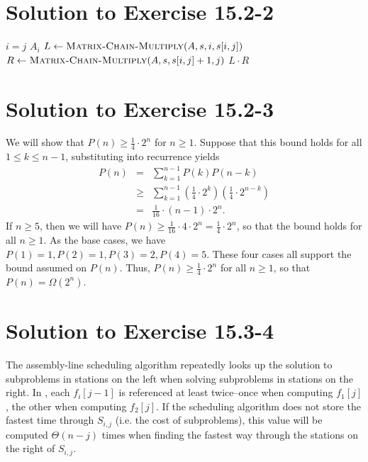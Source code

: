 \documentclass[a4paper, fleqn]{article}
\begin{document}
\section*{Solution to Exercise 15.2-2}

\begin{codebox}
\li \If $i = j$
\li   \Then \Return $A_i$
\li   \Else $L \gets \textnormal{\scshape Matrix-Chain-Multiply}(A, s, i, s[i,j])$
\li         $R \gets \textnormal{\scshape Matrix-Chain-Multiply}(A, s, s[i,j]+1, j)$
\li         \Return $L \cdot R$
    \End
\end{codebox}






\section*{Solution to Exercise 15.2-3}

We will show that $P(n) \geq \frac{1}{4} \cdot 2^n$ for $n \geq 1$.
Suppose that this bound holds for all $1 \leq k \leq n-1$,
substituting into recurrence yields
\begin{eqnarray*}
P(n) &  =   & \sum_{k=1}^{n-1} P(k) P(n-k) \\
     & \geq & \sum_{k=1}^{n-1} \left(\frac{1}{4} \cdot 2^k\right)
              \left(\frac{1}{4} \cdot 2^{n-k}\right) \\
     &  =   & \frac{1}{16} \cdot (n-1) \cdot 2^n.
\end{eqnarray*}
If $n \geq 5$, then we will have $P(n) \geq \frac{1}{16} \cdot 4 \cdot
2^n = \frac{1}{4} \cdot 2^n$, so that the bound holds for all $n \geq
1$. As the base cases, we have $P(1) = 1, P(2) = 1, P(3) = 2, P(4) =
5$. These four cases all support the bound assumed on $P(n)$. Thus,
$P(n) \geq \frac{1}{4} \cdot 2^n$ for all $n \geq 1$, so that $P(n) =
\Omega(2^n)$.






\section*{Solution to Exercise 15.3-4}

The assembly-line scheduling algorithm repeatedly looks up the
solution to subproblems in stations on the left when solving
subproblems in stations on the right. In , each
$f_i[j-1]$ is referenced at least twice--once when computing $f_1[j]$,
the other when computing $f_2[j]$. If the scheduling algorithm does
not store the fastest time through $S_{i,j}$ (i.e. the cost of
subproblems), this value will be computed $\Theta(n-j)$ times when
finding the fastest way through the stations on the right of
$S_{i,j}$.
\end{document}
